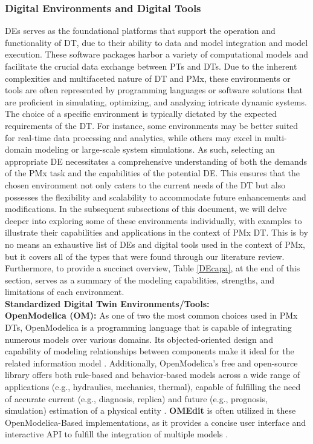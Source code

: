 \documentclass[runningheads]{llncs}
\begin{document}
\subsubsection{Digital Environments and Digital Tools}
DEs serves as the foundational platforms that support the operation and functionality of DT, due to their ability to data and model integration and model execution. These software packages harbor a variety of computational models and facilitate the crucial data exchange between PTs and DTs. Due to the inherent complexities and multifaceted nature of DT and PMx, these environments or tools are often represented by programming languages or software solutions that are proficient in simulating, optimizing, and analyzing intricate dynamic systems. The choice of a specific environment is typically dictated by the expected requirements of the DT. For instance, some environments may be better suited for real-time data processing and analytics, while others may excel in multi-domain modeling or large-scale system simulations. As such, selecting an appropriate DE necessitates a comprehensive understanding of both the demands of the PMx task and the capabilities of the potential DE. This ensures that the chosen environment not only caters to the current needs of the DT but also possesses the flexibility and scalability to accommodate future enhancements and modifications. In the subsequent subsections of this document, we will delve deeper into exploring some of these environments individually, with examples to illustrate their capabilities and applications in the context of PMx DT. This is by no means an exhaustive list of DEs and digital tools used in the context of PMx, but it covers all of the types that were found through our literature review. Furthermore, to provide a succinct overview, Table \ref{DEcapa}, at the end of this section, serves as a summary of the modeling capabilities, strengths, and limitations of each environment.\\

\noindent \textbf{Standardized Digital Twin Environments/Tools:}\\

\textbf{OpenModelica (OM):} As one of two the most common choices used in PMx DTs, OpenModelica is a programming language that is capable of integrating numerous models over various domains. Its objected-oriented design and capability of modeling relationships between components make it ideal for the related information model \cite{aivaliotis2019methodology}. Additionally, OpenModelica's free and open-source library offers both rule-based and behavior-based models across a wide range of applications (e.g., hydraulics, mechanics, thermal), capable of fulfilling the need of accurate current (e.g., diagnosis, replica) and future (e.g., prognosis, simulation) estimation of a physical entity \cite{fritzson2021openmodelica, vathoopan2018modular}. \textbf{OMEdit} is often utilized in these OpenModelica-Based implementations, as it provides a concise user interface and interactive API to fulfill the integration of multiple models \cite{aivaliotis2019use}.\\
\end{document}
